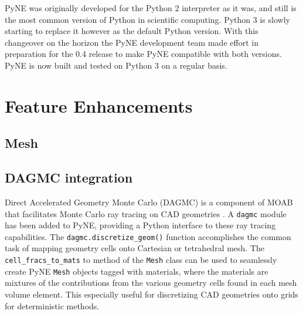 \documentclass{anstrans}
\begin{document}
PyNE was originally developed for the Python 2 interpreter as it was, 
and still is the most common version of Python in scientific computing. 
Python 3 is slowly starting to replace it however as the default Python 
version. With this changeover on the horizon the PyNE development team 
made effort in preparation for the 0.4 release to make PyNE compatible 
with both versions. PyNE is now built and tested on Python 3 on a regular basis.

\section{Feature Enhancements}

\subsection{Mesh}

%
%

\subsection{DAGMC integration}

Direct Accelerated Geometry Monte Carlo (DAGMC) is a component of MOAB that
facilitates Monte Carlo ray tracing on CAD geometries
\cite{tautges_acceleration_2009}.  A \texttt{dagmc} module has been added to
PyNE, providing a Python interface to these ray tracing capabilities. The
\texttt{dagmc.discretize\_geom()} function accomplishes the common task of
mapping geometry cells onto Cartesian or tetrahedral mesh. The
\texttt{cell\_fracs\_to\_mats} to method of the \texttt{Mesh} class can be used
to seamlessly create PyNE \texttt{Mesh} objects tagged with materials, where the
materials are mixtures of the contributions from the various geometry cells
found in each mesh volume element. This especially useful for discretizing CAD
geometries onto grids for deterministic methods.

\end{document}
